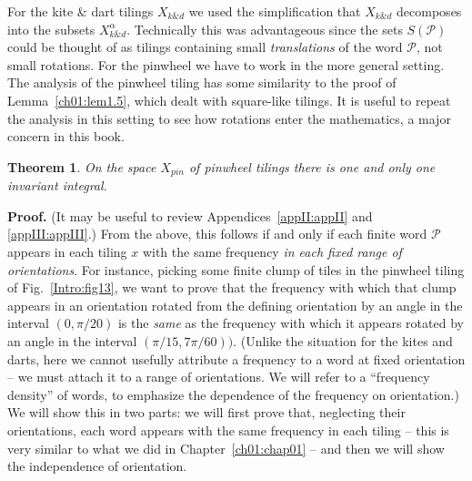 \documentclass[reqno]{stml-l}
\theoremstyle{plain}
\newtheorem{theorem}{Theorem}[chapter]
\theoremstyle{definition}
\numberwithin{equation}{chapter}
\begin{document}
For the kite \& dart tilings $X_{k\& d}$ we used the simplification that $X_{k\& d}$ decomposes into the subsets $X_{k\& d}^{\alpha}$. Technically this was advantageous since the sets $S(\mathcal{P})$ could be thought of as tilings containing small \emph{translations} of the word $\mathcal{P}$, not small rotations. For the pinwheel we have to work in the more general setting. The analysis of the pinwheel tiling has some similarity to the proof of Lemma~\ref{ch01:lem1.5}, which dealt with square-like tilings. It is useful to repeat the analysis in this setting to see how rotations enter the mathematics, a major concern in this book.

\begin{theorem}\label{ch04:thm4.4}
On the space $X_{pin}$ of pinwheel tilings there is one and only one invariant integral.
\end{theorem}

\noindent \textbf{Proof.} (It may be useful to review
Appendices~\ref{appII:appII} and \ref{appIII:appIII}.) From
the above, this follows if and only if each finite word
$\mathcal{P}$ appears in each tiling $x$ with the same
frequency \emph{in each fixed range of orientations}. For
instance, picking some finite clump of tiles in the
pinwheel tiling of Fig.~\ref{Intro:fig13}, we want to prove
that the frequency with which that clump appears in an
orientation rotated from the defining orientation by an
angle in the interval $(0, \pi/20)$ is the \emph{same} as
the frequency with which it appears rotated by an angle in
the interval $(\pi/15,7\pi/60))$. (Unlike the situation for
the kites and darts, here we cannot usefully attribute a
frequency to a word at fixed orientation -- we must attach
it to a range of orientations. We will refer to a
``frequency density'' of words, to emphasize the dependence
of the frequency on orientation.) We will show this in two
parts: we will first prove that, neglecting their
orientations, each word appears with the same frequency in
each tiling -- this is very similar to what we did in
Chapter~\ref{ch01:chap01} -- and then we will show the
independence of orientation.
\end{document}
